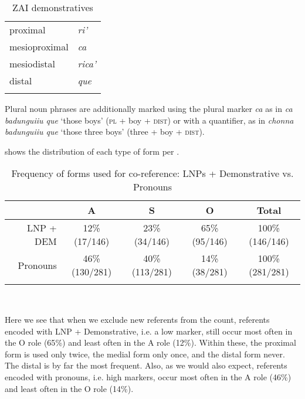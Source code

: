 \begin{table}  

\caption{{ZAI demonstratives}}
\begin{tabular}{ l  l }
\lsptoprule
 {proximal} & \textit{ri'} \\

 
 {mesioproximal} & \textit{ca} \\

 
 {mesiodistal} & \textit{rica'} \\

 
 {distal} & \textit{que} \\

\lspbottomrule
\end{tabular}
\label{zdmn}

\end{table}
Plural noun phrases are additionally marked using the plural marker \textit{ca} as in \textit{ca badunguiiu que} `those boys' (\textsc{pl} + boy + \textsc{dist}) or with a quantifier, as in \textit{chonna badunguiiu que} `those three boys' (three + boy + \textsc{dist}).

 shows the distribution of each type of form per .

\begin{table}

\caption{{Frequency of forms used for co-reference: LNPs + Demonstrative vs. Pronouns}}
\begin{tabular}{ r  c  c  c  c }
\lsptoprule
 & \textsc{A} & \textsc{S} & \textsc{O} & Total\\

\midrule
LNP + DEM & 12{\%} (17/146) & 23{\%} (34/146) & 65{\%} (95/146) & 100{\%} (146/146)  \\

 
Pronouns & 46{\%} (130/281) & 40{\%} (113/281) & 14{\%} (38/281) & 100{\%} (281/281)  \\

\lspbottomrule
\end{tabular}\\
\label{coreferenceforms}

\end{table}
Here we see that when we exclude new referents from the count, referents encoded with LNP + Demonstrative, i.e. a low  marker, still occur most often in the O role (65{\%}) and least often in the A role (12{\%}). Within these, the proximal form is used only twice, the medial form only once, and the distal form never. The distal  is by far the most frequent. Also, as we would also expect, referents encoded with pronouns, i.e. high  markers, occur most often in the A role (46{\%}) and least often in the O role (14{\%}). 

